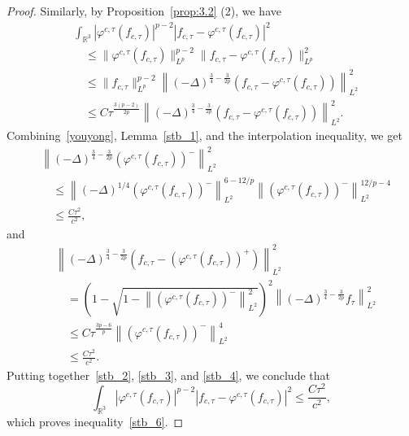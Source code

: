 \documentclass{amsart}
\theoremstyle{plain}
\theoremstyle{definition}
\theoremstyle{remark}
\numberwithin{equation}{section} \numberwithin{figure}{section}
\begin{document}
\begin{proof}
      Similarly, by Proposition~\ref{prop:3.2} (2), we have
      \begin{equation}\label{stb_2}
      \begin{aligned}
      &\int_{\mathbb{R}^3} |\varphi^{c,\tau}(f_{c, \tau})|^{p-2} \left| f_{c,\tau} - \varphi^{c,\tau}(f_{c, \tau}) \right|^2 \\
      &\quad\leq \|\varphi^{c,\tau}(f_{c, \tau})\|_{L^p}^{p-2} \| f_{c,\tau} - \varphi^{c,\tau}(f_{c, \tau}) \|_{L^p}^2 \\
      &\quad\leq \|f_{c,\tau}\|_{L^p}^{p-2} \left\|(-\Delta)^{\frac{3}{4} - \frac{3}{2p}} (f_{c,\tau} - \varphi^{c,\tau}(f_{c, \tau}))\right\|_{L^2}^2 \\
      &\quad\leq C \tau^{\frac{3(p-2)}{2p}} \left\|(-\Delta)^{\frac{3}{4} - \frac{3}{2p}} (f_{c,\tau} - \varphi^{c,\tau}(f_{c, \tau}))\right\|_{L^2}^2.
      \end{aligned}
      \end{equation}
      Combining~\eqref{youyong}, Lemma~\ref{stb_1}, and the interpolation inequality, we get
      \begin{equation}\label{stb_3}
      \begin{aligned}
      &\left\|(-\Delta)^{\frac{3}{4} - \frac{3}{2p}} \left(\varphi^{c,\tau}(f_{c, \tau})\right)^-\right\|_{L^2}^2 \\
      &\quad\leq \left\|(-\Delta)^{1/4} \left(\varphi^{c,\tau}(f_{c, \tau})\right)^-\right\|_{L^2}^{6 - 12/p} \left\|\left(\varphi^{c,\tau}(f_{c, \tau})\right)^-\right\|_{L^2}^{12/p - 4} \\
      &\quad\leq \frac{C \tau^2}{c^2},
      \end{aligned}
      \end{equation}
      and
      \begin{equation}\label{stb_4}
      \begin{aligned}
      &\left\|(-\Delta)^{\frac{3}{4} - \frac{3}{2p}} \left(f_{c,\tau} - \left(\varphi^{c,\tau}(f_{c, \tau})\right)^+\right)\right\|_{L^2}^2 \\
      &\quad= \left(1 - \sqrt{1 - \left\| \left(\varphi^{c,\tau}(f_{c, \tau})\right)^- \right\|_{L^2}^2} \right)^2 \left\|(-\Delta)^{\frac{3}{4} - \frac{3}{2p}} f_{\tau}\right\|_{L^2}^2 \\
      &\quad\leq C \tau^{\frac{3p-6}{p}} \left\| \left(\varphi^{c,\tau}(f_{c, \tau})\right)^- \right\|_{L^2}^4 \\
      &\quad\leq \frac{C \tau^{2}}{c^2}.
      \end{aligned}
      \end{equation}
      Putting together~\eqref{stb_2}, \eqref{stb_3}, and \eqref{stb_4}, we conclude that
      \[
      \int_{\mathbb{R}^3} |\varphi^{c,\tau}(f_{c, \tau})|^{p-2} \left| f_{c,\tau} - \varphi^{c,\tau}(f_{c, \tau}) \right|^2 \leq \frac{C \tau^{2}}{c^2},
      \]
      which proves inequality~\eqref{stb_6}.
      \end{proof}
      
\end{document}
